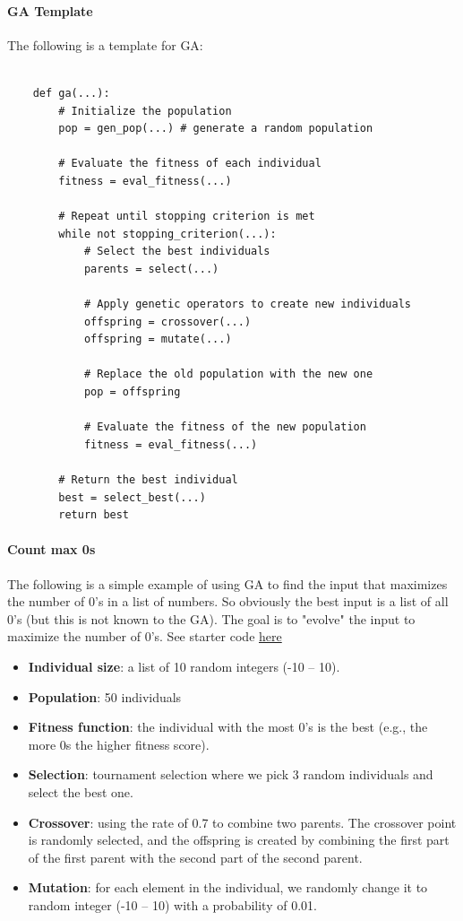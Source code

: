 \documentclass[oneside,11pt,dvipsnames]{book}
\begin{document}
\paragraph{GA Template} The following is a template for GA:
\begin{lstlisting}

    def ga(...):
        # Initialize the population
        pop = gen_pop(...) # generate a random population

        # Evaluate the fitness of each individual
        fitness = eval_fitness(...)

        # Repeat until stopping criterion is met
        while not stopping_criterion(...):
            # Select the best individuals
            parents = select(...)
            
            # Apply genetic operators to create new individuals
            offspring = crossover(...)
            offspring = mutate(...)
            
            # Replace the old population with the new one
            pop = offspring

            # Evaluate the fitness of the new population
            fitness = eval_fitness(...)
            
        # Return the best individual
        best = select_best(...)
        return best
\end{lstlisting}


\paragraph{Count max 0s} The following is a simple example of using GA to find the input that maximizes the number of 0's in a list of numbers. So obviously the best input is a list of all 0's (but this is not known to the GA). The goal is to "evolve" the input to maximize the number of 0's.  See starter code \href{https://nguyenthanhvuh.github.io/class-oo/files/ga-count-0s.py}{here}

\begin{itemize}
    \item \textbf{Individual size}: a list of 10 random integers (-10 -- 10). 
    \item \textbf{Population}: 50 individuals
    \item \textbf{Fitness function}: the individual with the most 0's is the best (e.g., the more 0s the higher fitness score).
    \item \textbf{Selection}: tournament selection where we pick 3 random individuals and select the best one.
    \item \textbf{Crossover}: using the rate of 0.7 to combine two parents. The crossover point is randomly selected, and the offspring is created by combining the first part of the first parent with the second part of the second parent.
    \item \textbf{Mutation}: for each element in the individual, we randomly change it to random integer (-10 -- 10) with a probability of 0.01. 
\end{itemize}
\end{document}

